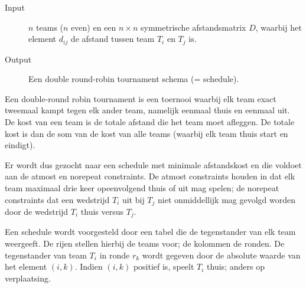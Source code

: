 \documentclass[a4paper,dutch,11pt,]{scrartcl}
\begin{document}
\begin{description}
 \item[Input] $n$ teams ($n$ even) en een $n\times{}n$ symmetrische afstandsmatrix $D$, waarbij het element $d_{ij}$ de afstand tussen team $T_i$ en $T_j$ is.
 \item[Output] Een double round-robin tournament schema (= schedule).
\end{description}

Een double-round robin tournament is een toernooi waarbij elk team exact tweemaal kampt tegen elk ander team, namelijk eenmaal thuis en eenmaal uit.
De kost van een team is de totale afstand die het team moet afleggen.
De totale kost is dan de som van de kost van alle teams (waarbij elk team thuis start en eindigt). 

Er wordt dus gezocht naar een schedule met minimale afstandskost en die voldoet aan de atmost en norepeat constraints.
De atmost constraints houden in dat elk team maximaal drie keer opeenvolgend thuis of uit mag spelen; de norepeat constraints dat een wedstrijd $T_i$ uit bij $T_j$ niet onmiddellijk mag gevolgd worden door de wedstrijd $T_i$ thuis versus $T_j$.

Een schedule wordt voorgesteld door een tabel die de tegenstander van elk team weergeeft. De rijen stellen hierbij de teams voor; de kolommen de ronden.
De tegenstander van team $T_i$ in ronde $r_k$ wordt gegeven door de absolute waarde van het element $(i,k)$. Indien $(i,k)$ positief is, speelt $T_i$ thuis; anders op verplaatsing.




%
\end{document}
